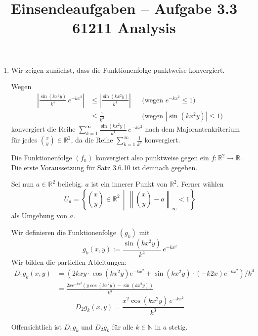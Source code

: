 \documentclass[a4paper,12pt]{article}
\title{Einsendeaufgaben -- Aufgabe 3.3\\[0.5em]
\large 61211 Analysis}
\author{}
\date{}
\begin{document}
\maketitle

\begin{enumerate}[label=\alph*)]
    \item

          Wir zeigen zunächst, dass die Funktionenfolge punktweise konvergiert.

          Wegen
          \begin{align*}
              \left| \frac{\sin(kx^2 y)}{k^4} \, e^{-kx^2} \right|
               & \leq \left| \frac{\sin(kx^2 y)}{k^4} \right| && \text{(wegen } e^{-kx^2} \leq 1 \text{)}    \\
               & \leq \frac{1}{k^4}                           && \text{(wegen } |\sin(kx^2 y)| \leq 1 \text{)}
          \end{align*}
          konvergiert die Reihe $\sum_{k=1}^{\infty} \frac{\sin(kx^2 y)}{k^4} \, e^{-kx^2}$
          nach dem Majorantenkriterium für jedes $\binom{x}{y} \in \mathbb{R}^2$, da die Reihe
          $\sum_{k=1}^{\infty} \frac{1}{k^4}$ konvergiert.

          Die Funktionenfolge $(f_n)$ konvergiert also punktweise gegen ein $f: \mathbb{R}^2 \to \mathbb{R}$.
          Die erste Voraussetzung für Satz 3.6.10 ist demnach gegeben.

          Sei nun $a \in \mathbb{R}^2$ beliebig. $a$ ist ein innerer Punkt von $\mathbb{R}^2$. Ferner wählen
          \[
              U_a = \left\{ \binom{x}{y} \in \mathbb{R}^2 \,\middle|\, \left\| \binom{x}{y} - a \right\|_\infty < 1 \right\}
          \]
          als Umgebung von $a$.

          Wir definieren die Funktionenfolge $(g_k)$ mit
          \[
              g_k(x,y) := \frac{\sin(kx^2 y)}{k^4} \, e^{-kx^2}
          \]
          Wir bilden die partiellen Ableitungen:
          \begin{align*}
              D_1 g_k(x,y) & = \left( 2kxy \cdot \cos(kx^2 y) e^{-kx^2} + \sin(kx^2 y) \cdot (-k 2x) e^{-kx^2} \right) / k^4 \\
                           & = \frac{2 x e^{-kx^2} \left( y \cos(kx^2 y) - \sin(kx^2 y) \right)}{k^3}
          \end{align*}
          \[
              D_2 g_k(x,y) = \frac{x^2 \cos(kx^2 y) \, e^{-kx^2}}{k^3}
          \]

          Offensichtlich ist $D_1 g_k$ und $D_2 g_k$ für alle $k \in \mathbb{N}$ in $a$ stetig.


\end{enumerate}
\end{document}
